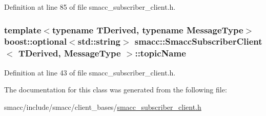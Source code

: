 Definition at line 85 of file smacc\+\_\+subscriber\+\_\+client.\+h.

\subsubsection[{\texorpdfstring{topic\+Name}{topicName}}]{\setlength{\rightskip}{0pt plus 5cm}template$<$typename T\+Derived, typename Message\+Type$>$ boost\+::optional$<$std\+::string$>$ {\bf smacc\+::\+Smacc\+Subscriber\+Client}$<$ T\+Derived, Message\+Type $>$\+::topic\+Name}\hypertarget{classsmacc_1_1SmaccSubscriberClient_a573625f4b97228c0e9110fb4538722f2}{}\label{classsmacc_1_1SmaccSubscriberClient_a573625f4b97228c0e9110fb4538722f2}


Definition at line 43 of file smacc\+\_\+subscriber\+\_\+client.\+h.



The documentation for this class was generated from the following file\+:\begin{DoxyCompactItemize}
\item 
smacc/include/smacc/client\+\_\+bases/\hyperlink{smacc__subscriber__client_8h}{smacc\+\_\+subscriber\+\_\+client.\+h}\end{DoxyCompactItemize}
